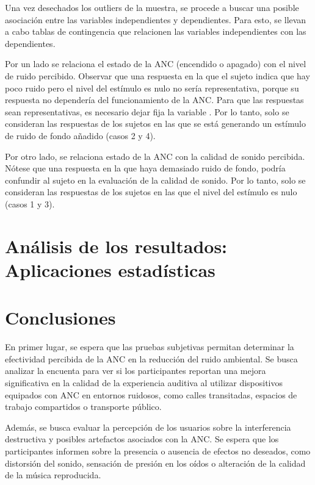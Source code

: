 \documentclass[a4paper,12pt]{article}
\begin{document}
Una vez desechados los outliers de la muestra, se procede a buscar una posible asociación entre las variables independientes y dependientes.
Para esto, se llevan a cabo tablas de contingencia que relacionen las variables independientes con las dependientes.

Por un lado se relaciona el estado de la ANC (encendido o apagado) con el nivel de ruido percibido.
Observar que una respuesta en la que el sujeto indica que hay poco ruido pero el nivel del estímulo es nulo no sería representativa, porque su respuesta no dependería del funcionamiento de la ANC.
Para que las respuestas sean representativas, es necesario dejar fija la variable .
Por lo tanto, solo se consideran las respuestas de los sujetos en las que se está generando un estímulo de ruido de fondo añadido (casos 2 y 4).

Por otro lado, se relaciona estado de la ANC con la calidad de sonido percibida.
Nótese que una respuesta en la que haya demasiado ruido de fondo, podría confundir al sujeto en la evaluación de la calidad de sonido.
Por lo tanto, solo se consideran las respuestas de los sujetos en las que el nivel del estímulo es nulo (casos 1 y 3).

\section{Análisis de los resultados: Aplicaciones estadísticas}
\label{sec:results}



\section{Conclusiones}

En primer lugar, se espera que las pruebas subjetivas permitan determinar la efectividad percibida de la ANC en la reducción del ruido ambiental.
Se busca analizar la encuenta para ver si los participantes reportan una mejora significativa en la calidad de la experiencia auditiva al utilizar dispositivos equipados con ANC en entornos ruidosos, como calles transitadas, espacios de trabajo compartidos o transporte público.

Además, se busca evaluar la percepción de los usuarios sobre la interferencia destructiva y posibles artefactos asociados con la ANC.
Se espera que los participantes informen sobre la presencia o ausencia de efectos no deseados, como distorsión del sonido, sensación de presión en los oídos o alteración de la calidad de la música reproducida.
\end{document}
